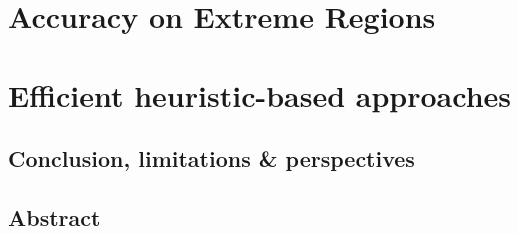 \documentclass{ecsthesis}      %
\begin{document}
\part{Accuracy on Extreme Regions}\label{part:vect}




\part{Efficient heuristic-based approaches}
\label{part:heuristic}




\chapter{Conclusion, limitations \& perspectives}\label{chap:concl}


\appendix
%
%
\backmatter



\chapter*{Abstract}

\end{document}
